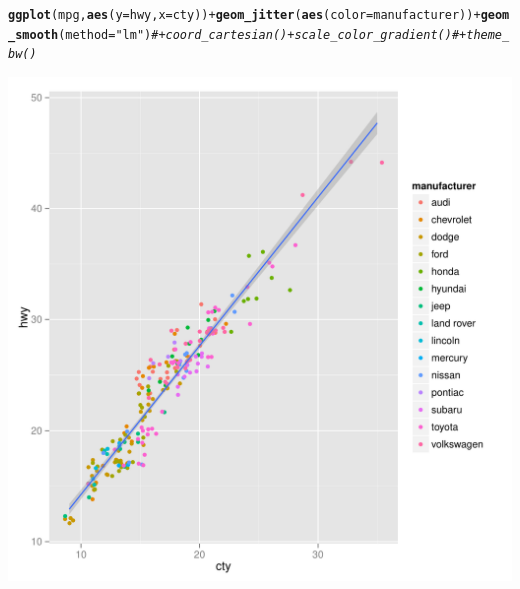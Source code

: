 \documentclass{article}\usepackage[]{graphicx}\usepackage[]{color}
\makeatletter
\def\maxwidth{ %
  \ifdim\Gin@nat@width>\linewidth
    \linewidth
  \else
    \Gin@nat@width
  \fi
}
\newcommand{\hlstr}[1]{\textcolor[rgb]{0.192,0.494,0.8}{#1}}%
\newcommand{\hlcom}[1]{\textcolor[rgb]{0.678,0.584,0.686}{\textit{#1}}}%
\newcommand{\hlopt}[1]{\textcolor[rgb]{0,0,0}{#1}}%
\newcommand{\hlstd}[1]{\textcolor[rgb]{0.345,0.345,0.345}{#1}}%
\newcommand{\hlkwc}[1]{\textcolor[rgb]{0.333,0.667,0.333}{#1}}%
\newcommand{\hlkwd}[1]{\textcolor[rgb]{0.737,0.353,0.396}{\textbf{#1}}}%
\newenvironment{kframe}{%
 \def\at@end@of@kframe{}%
 \ifinner\ifhmode%
  \def\at@end@of@kframe{\end{minipage}}%
  \begin{minipage}{\columnwidth}%
 \fi\fi%
 \def\FrameCommand##1{\hskip\@totalleftmargin \hskip-\fboxsep
 \colorbox{shadecolor}{##1}\hskip-\fboxsep
     \hskip-\linewidth \hskip-\@totalleftmargin \hskip\columnwidth}%
 \MakeFramed {\advance\hsize-\width
   \@totalleftmargin\z@ \linewidth\hsize
   \@setminipage}}%
 {\par\unskip\endMakeFramed%
 \at@end@of@kframe}
\newenvironment{knitrout}{}{} %
\makeatother
\begin{document}
\begin{knitrout}
\color{fgcolor}\begin{kframe}
\begin{alltt}
\hlkwd{ggplot}\hlstd{(mpg,} \hlkwd{aes}\hlstd{(}\hlkwc{y}\hlstd{=hwy,} \hlkwc{x}\hlstd{=cty))} \hlopt{+}\hlkwd{geom_jitter}\hlstd{(}\hlkwd{aes}\hlstd{(}\hlkwc{color} \hlstd{= manufacturer))} \hlopt{+}\hlkwd{geom_smooth}\hlstd{(}\hlkwc{method} \hlstd{=}\hlstr{"lm"}\hlstd{)} \hlcom{#+coord_cartesian() +scale_color_gradient() #+theme_bw()}
\end{alltt}
\end{kframe}
\includegraphics[width=\maxwidth]{figure/explo3-1} 

\end{knitrout}
\end{document}
